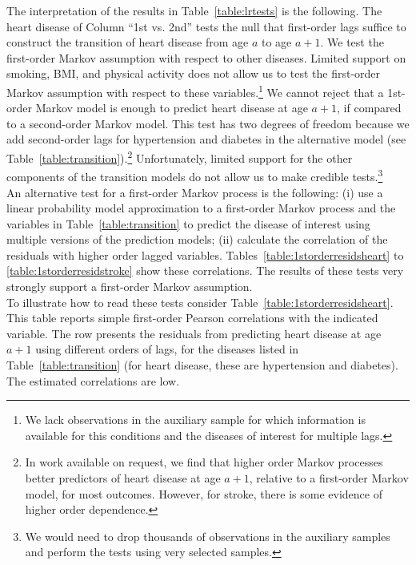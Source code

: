 \noindent The interpretation of the results in Table~\ref{table:lrtests} is the following. The heart disease of Column ``1st vs. 2nd'' tests the null that first-order lags suffice to construct the transition of heart disease from age $a$ to age $a+1$. We test the first-order Markov assumption with respect to other diseases. Limited support on smoking, BMI, and physical activity does not allow us to test the first-order Markov assumption with respect to these variables.\footnote{We lack observations in the auxiliary sample for which information is available for this conditions and the diseases of interest for multiple lags.} We cannot reject that a 1st-order Markov model is enough to predict heart disease at age $a+1$, if compared to a second-order Markov model. This test has two degrees of freedom because we add second-order lags for hypertension and diabetes in the alternative model (see Table~\ref{table:transition}).\footnote{In work available on request, we find that higher order Markov processes better predictors of heart disease at age $a+1$, relative to a first-order Markov model, for most outcomes. However, for stroke, there is some evidence of higher order dependence.} Unfortunately, limited support for the other components of the transition models do not allow us to make credible tests.\footnote{We would need to drop thousands of observations in the auxiliary samples and perform the tests using very selected samples.}\\

\noindent An alternative test for a first-order Markov process is the following: (i) use a linear probability model approximation to a first-order Markov process and the variables in Table~\ref{table:transition} to predict the disease of interest using multiple versions of the prediction models; (ii) calculate the correlation of the residuals with higher order lagged variables. Tables~\ref{table:1storderresidsheart} to \ref{table:1storderresidstroke} show these correlations. The results of these tests very strongly support a first-order Markov assumption.\\

\noindent To illustrate how to read these tests consider Table~\ref{table:1storderresidsheart}. This table reports simple first-order Pearson correlations with the indicated variable. The row presents the residuals from predicting heart disease at age $a+1$ using different orders of lags, for the diseases listed in Table~\ref{table:transition} (for heart disease, these are hypertension and diabetes). The estimated correlations are low.

